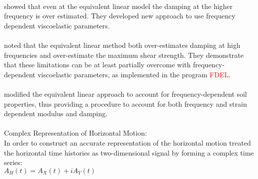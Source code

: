 \\
\citet{Kausel2002} showed that even at the equivalent linear model the damping at the higher frequency is over estimated. They developed new approach to use frequency dependent viscoelastic parameters.\\
\\
\citet{Yoshida2002} noted that the equivalent linear method both over-estimates damping at high frequencies and over-estimate the maximum shear strength. They demonstrate that these limitations can be at least partially overcome with frequency-dependent viscoelastic parameters, as implemented in the program \textcolor{red}{FDEL}.\\
\\
\citet{Park2008} modified the equivalent linear approach to account for frequency-dependent soil properties, thus providing a procedure to account for both frequency and strain dependent modulus and damping.\\
\\
Complex Representation of Horizontal Motion:\\
In order to construct an accurate representation of the horizontal motion \citet{Steidl1996} treated the horizontal time histories as two-dimensional signal by forming a complex time series: \\
$A_H(t) = A_X(t) + iA_Y(t)$

  






